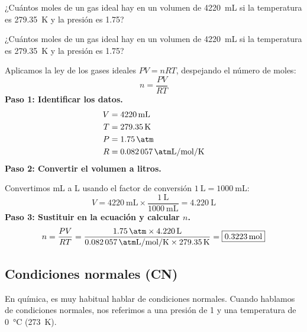 \begin{exercise}
    ¿Cuántos moles de un gas ideal hay en un volumen de \qty{4220}{\mL} si la temperatura es \qty{279.35}{\kelvin} y la presión es \qty{1.75}{\atmosphere}?
    \begin{solu}
        ¿Cuántos moles de un gas ideal hay en un volumen de \qty{4220}{\mL} si la temperatura es \qty{279.35}{\kelvin} y la presión es \qty{1.75}{\atmosphere}?

        Aplicamos la ley de los gases ideales $PV = nRT$, despejando el número de moles:
        \begin{equation*}
            n = \frac{PV}{RT}
        \end{equation*}
        \textbf{Paso 1: Identificar los datos.}
        \begin{align*}
            V &= \qty{4220}{\mL} \\
            T &= \qty{279.35}{\kelvin} \\
            P &= \qty{1.75}{\atm} \\
            R &= \qty{0.082057}{\atm\liter\per\mol\per\kelvin}
        \end{align*}
        \textbf{Paso 2: Convertir el volumen a litros.}

        Convertimos mL a L usando el factor de conversión $\qty{1}{\liter} = \qty{1000}{\mL}$:
        \begin{equation*}
            V = \qty{4220}{\mL} \times \frac{\qty{1}{\liter}}{\qty{1000}{\mL}} = \qty{4.220}{\liter}
        \end{equation*}
        \textbf{Paso 3: Sustituir en la ecuación y calcular $n$.}
        \begin{equation*}
            n = \frac{PV}{RT} = \frac{\qty{1.75}{\atm} \times \qty{4.220}{\liter}}{\qty{0.082057}{\atm\liter\per\mol\per\kelvin} \times \qty{279.35}{\kelvin}} = \boxed{\qty{0.3223}{\mol}}
        \end{equation*}
    \end{solu}
\end{exercise}

\subsection{Condiciones normales (CN)}

En química, es muy habitual hablar de condiciones normales.
Cuando hablamos de condiciones normales, nos referimos a una presión de \qty{1}{\atmosphere} y una temperatura de \qty{0}{\degreeCelsius} (\qty{273}{\kelvin}).

